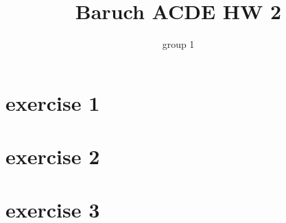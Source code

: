 \documentclass{article}
\title{Baruch ACDE HW 2}
\author{group 1}
\begin{document}
\maketitle
\section*{exercise 1}
\section*{exercise 2}
\section*{exercise 3}
\end{document}
